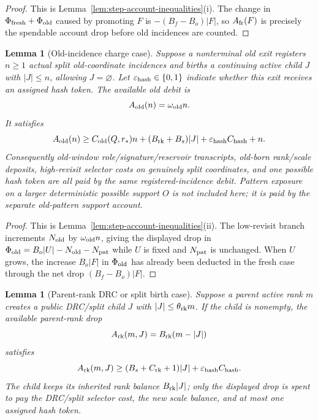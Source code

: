 \documentclass[11pt]{article}
\newtheorem{lemma}[theorem]{Lemma}
\begin{document}
\begin{proof}
This is Lemma~\ref{lem:step-account-inequalities}(i).  The change in
$\Phi_{\rm fresh}+\Phi_{\rm old}$ caused by promoting $F$ is
$-(B_f-B_o)|F|$, so $A_{\rm fr}(F)$ is precisely the spendable account drop
before old incidences are counted.
\end{proof}

\begin{lemma}[Old-incidence charge case]
\label{lem:old-charge-case}
Suppose a nonterminal old exit registers $n\ge1$ actual split old-coordinate
incidences and births a continuing active child $J$ with $|J|\le n$, allowing
$J=\varnothing$.
Let $\varepsilon_{\rm hash}\in\{0,1\}$ indicate whether this exit receives an
assigned hash token.  The available old debit is
\[
  A_{\rm old}(n)=\omega_{\rm old}n .
\]
It satisfies
\[
  A_{\rm old}(n)
  \ge
  C_{\rm old}(Q,r_*)n+(B_{\rm rk}+B_s)|J|
  +\varepsilon_{\rm hash}C_{\rm hash}+n .
\]
Consequently old-window role/signature/reservoir transcripts, old-born
rank/scale deposits, high-revisit selector costs on genuinely split
coordinates, and one possible hash token are all paid by the same
registered-incidence debit.  Pattern exposure on a larger deterministic
possible support $O$ is not included here; it is paid by the separate
old-pattern support account.
\end{lemma}

\begin{proof}
This is Lemma~\ref{lem:step-account-inequalities}(ii).  The low-revisit branch
increments $N_{\rm old}$ by $\omega_{\rm old}n$, giving the displayed drop in
$\Phi_{\rm old}=B_o|U|-N_{\rm old}-N_{\rm pat}$ while $U$ is fixed and
$N_{\rm pat}$ is unchanged.  When $U$ grows, the
increase $B_o|F|$ in $\Phi_{\rm old}$ has already been deducted in the fresh
case through the net drop $(B_f-B_o)|F|$.
\end{proof}

\begin{lemma}[Parent-rank DRC or split birth case]
\label{lem:rank-birth-charge-case}
Suppose a parent active rank $m$ creates a public DRC/split child
$J$ with $|J|\le\theta_{\rm rk}m$.  If the child is nonempty, the available
parent-rank drop
\[
  A_{\rm rk}(m,J)=B_{\rm rk}(m-|J|)
\]
satisfies
\[
  A_{\rm rk}(m,J)
  \ge
  (B_s+C_{\rm rk}+1)|J|+\varepsilon_{\rm hash}C_{\rm hash}.
\]
The child keeps its inherited rank balance $B_{\rm rk}|J|$; only the displayed
drop is spent to pay the DRC/split selector cost, the new scale balance, and at
most one assigned hash token.
\end{lemma}
\end{document}
